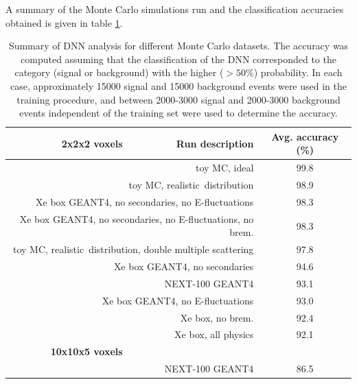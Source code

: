\documentclass[a4paper,11pt]{article}
\begin{document}
A summary of the Monte Carlo simulations run and the classification accuracies obtained is given in table \ref{tbl.DNNsummary}.  

\begin{table}[!htb]
	\begin{center}
		\caption[DNN analysis summary]{\label{tbl.DNNsummary}Summary of DNN analysis for different Monte Carlo datasets.  The accuracy was computed assuming that the classification
			of the DNN corresponded to the category (signal or background) with the higher ($> 50$\%) probability.  In each case, approximately 15000 signal and 15000 background events were
			used in the training procedure, and between 2000-3000 signal and 2000-3000 background events independent of the training set were used to determine the accuracy.}
		\begin{tabular}{rrc}
			\\
			\textbf{2x2x2 voxels} & \textbf{Run description} & \textbf{Avg. accuracy} (\%)\\
			\hline
			\multicolumn{2}{r}{toy MC, ideal} & 99.8\\
			\multicolumn{2}{r}{toy MC, realistic \bbonu\,distribution} & 98.9\\
			\multicolumn{2}{r}{Xe box GEANT4, no secondaries, no E-fluctuations} & 98.3\\
			\multicolumn{2}{r}{Xe box GEANT4, no secondaries, no E-fluctuations, no brem.} & 98.3\\
			\multicolumn{2}{r}{toy MC, realistic \bbonu\,distribution, double multiple scattering} & 97.8\\
			\multicolumn{2}{r}{Xe box GEANT4, no secondaries} & 94.6\\
			\multicolumn{2}{r}{NEXT-100 GEANT4} & 93.1\\
			\multicolumn{2}{r}{Xe box GEANT4, no E-fluctuations} & 93.0\\
			\multicolumn{2}{r}{Xe box, no brem.} & 92.4\\
			\multicolumn{2}{r}{Xe box, all physics} & 92.1\\
			\textbf{10x10x5 voxels} & & \\
			\hline
			\multicolumn{2}{r}{NEXT-100 GEANT4} & 86.5
		\end{tabular}
	\end{center}
\end{table}

\end{document}
